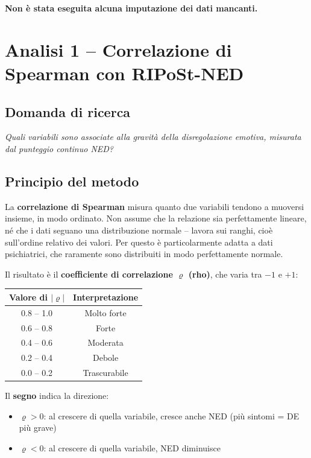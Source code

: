 \documentclass[12pt, a4paper]{article}
\begin{document}
\textbf{Non è stata eseguita alcuna imputazione dei dati mancanti.}

\section{Analisi 1 -- Correlazione di Spearman con RIPoSt-NED}

\subsection{Domanda di ricerca}

\textit{Quali variabili sono associate alla gravità della disregolazione emotiva, misurata
dal punteggio continuo NED?}

\subsection{Principio del metodo}

La \textbf{correlazione di Spearman} misura quanto due variabili tendono a muoversi insieme,
in modo ordinato. Non assume che la relazione sia perfettamente lineare, né che i dati
seguano una distribuzione normale -- lavora sui ranghi, cioè sull'ordine relativo dei valori.
Per questo è particolarmente adatta a dati psichiatrici, che raramente sono distribuiti in
modo perfettamente normale.

Il risultato è il \textbf{coefficiente di correlazione $\varrho$ (rho)}, che varia tra
$-1$ e $+1$:

\begin{center}
\begin{tabular}{cc}
\toprule
\textbf{Valore di $|\varrho|$} & \textbf{Interpretazione} \\
\midrule
0.8 -- 1.0 & Molto forte \\
0.6 -- 0.8 & Forte \\
0.4 -- 0.6 & Moderata \\
0.2 -- 0.4 & Debole \\
0.0 -- 0.2 & Trascurabile \\
\bottomrule
\end{tabular}
\end{center}

Il \textbf{segno} indica la direzione:
\begin{itemize}
    \item $\varrho > 0$: al crescere di quella variabile, cresce anche NED (più sintomi = DE
          più grave)
    \item $\varrho < 0$: al crescere di quella variabile, NED diminuisce
\end{itemize}
\end{document}
